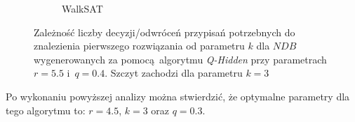 \begin{figure}[!htb]
\begin{subfigure}{0.5\textwidth}
    \caption{WalkSAT}
    \label{chrt:q-k-w}
\end{subfigure}
\caption{Zależność liczby decyzji/odwróceń przypisań potrzebnych do znalezienia pierwszego rozwiązania od parametru $k$ dla $NDB$ wygenerowanych za pomocą algorytmu \textit{Q-Hidden} przy parametrach $r=5.5$ i~$q=0.4$.
    Szczyt zachodzi dla parametru $k=3$}
\end{figure}

Po wykonaniu powyższej analizy można stwierdzić, że optymalne parametry dla tego algorytmu to: $r=4.5$, $k=3$ oraz $q=0.3$. 

